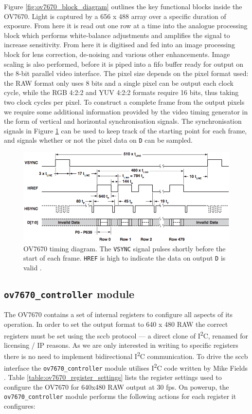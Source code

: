 Figure \ref{fig:ov7670_block_diagram} outlines the key functional blocks inside the OV7670. Light is captured by a 656 x 488 array over a specific duration of exposure. From here it is read out one row at a time into the analogue processing block which performs white-balance adjustments and amplifies the signal to increase sensitivity. From here it is digitised and fed into an image processing block for lens correction, de-noising and various other enhancements. Image scaling is also performed, before it is piped into a \gls{fifo} buffer ready for output on the 8-bit parallel video interface. The pixel size depends on the pixel format used: the RAW format only uses 8 bits and a single pixel can be output each clock cycle, while the RGB 4:2:2 and YUV 4:2:2 formats require 16 bits, thus taking two clock cycles per pixel. To construct a complete frame from the output pixels we require some additional information provided by the video timing generator in the form of vertical and horizontal synchronisation signals. The synchronisation signals in Figure \ref{fig:ov7670_timing} can be used to keep track of the starting point for each frame, and signals whether or not the pixel data on \texttt{D} can be sampled. 

\begin{figure}
  \centering
  \includegraphics[width=1\textwidth]{./img/ov7670_timing.png}
  \caption{OV7670 timing diagram. The \texttt{VSYNC} signal pulses shortly before the start of each frame. \texttt{HREF} is high to indicate the data on output \texttt{D} is valid \cite{ov7670_datasheet}.}
  \label{fig:ov7670_timing}
\end{figure}

\subsection{\texttt{ov7670\_controller} module}
The OV7670 contains a set of internal registers to configure all aspects of its operation. In order to set the output format to 640 x 480 RAW the correct registers must be set using the \gls{sccb} protocol --- a direct clone of I\textsuperscript{2}C, renamed for licensing / IP reasons. As we are only interested in writing to specific registers there is no need to implement bidirectional I\textsuperscript{2}C communication. To drive the \gls{sccb} interface the \texttt{ov7670\_controller} module utilises I\textsuperscript{2}C code written by Mike Fields \cite{hamsterworks}. Table \ref{table:ov7670_register_settings} lists the register settings used to configure the OV7670 for 640x480 RAW output at 30 \gls{fps}. On powerup, the \texttt{ov7670\_controller} module performs the following actions for each register it configures:


